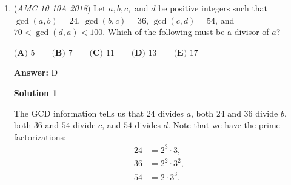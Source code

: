 \begin{enumerate}
\textbf{Solution 12 (cheap)}

We observe that there is more than one value for $a$, so we can eliminate $(A)$ and $(D)$. We can also observe that as we increase $a$, the parabola will always intersect the circle at 3 points, which eliminates $(B)$. Finally, we notice that if the $a=1/4$ case is not a perfect square, then $(C)$ is not the correct answer.

 


 Substituting $1/4$ for $a$, we get:

 


 $x^2+y^2=(1/4)^2$
$x^2-1/4=y$ --> $x^2=y+1/4$
$y^2+y+1/4=(1/4)^2$ --> $y^2+y+3/16$

 


 From this, we can see that the $a=1/4$ case is incorrect, so our final answer is $\boxed{\textbf{(E)}a>\frac12}$.

 - WB0s0n

 


 \href{https://artofproblemsolving.com/videos/amc/2018amc10a/466}{https://artofproblemsolving.com/videos/amc/2018amc10a/466}

 


	\item (\textit{AMC 10 10A 2018}) Let $a, b, c,$ and $d$ be positive integers such that $\gcd(a, b)=24$, $\gcd(b, c)=36$, $\gcd(c, d)=54$, and $70<\gcd(d, a)<100$. Which of the following must be a divisor of $a$?


 $\textbf{(A)} \text{ 5} \qquad \textbf{(B)} \text{ 7} \qquad \textbf{(C)} \text{ 11} \qquad \textbf{(D)} \text{ 13} \qquad \textbf{(E)} \text{ 17}$

 \textbf{Answer: }D



\textbf{Solution 1}

The GCD information tells us that $24$ divides $a$, both $24$ and $36$ divide $b$, both $36$ and $54$ divide $c$, and $54$ divides $d$. Note that we have the prime factorizations:
 \begin{align*} 24 &= 2^3\cdot 3,\\ 36 &= 2^2\cdot 3^2,\\ 54 &= 2\cdot 3^3. \end{align*}



\end{enumerate}
